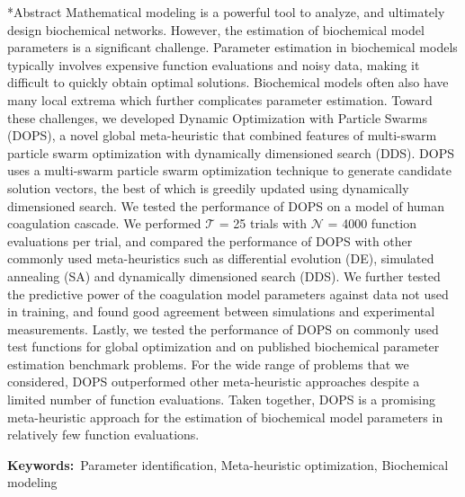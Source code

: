 \documentclass[12pt]{article}
\makeatletter
\renewcommand\section{\@startsection
	{subsection}{2}{0mm}
	{-0.2in}
	{0.05\baselineskip}
	{\normalfont\large\bfseries}}
\makeatother
\begin{document}
\section*{Abstract}
Mathematical modeling is a powerful tool to analyze, and ultimately design biochemical networks.
However, the estimation of biochemical model parameters is a significant challenge.
Parameter estimation in biochemical models typically involves expensive function evaluations and noisy data, making it difficult to quickly obtain optimal solutions.
Biochemical models often also have many local extrema which further complicates parameter estimation.
Toward these challenges, we developed Dynamic Optimization with Particle Swarms (DOPS), a novel global meta-heuristic that combined features of multi-swarm particle swarm optimization with dynamically dimensioned search (DDS).
DOPS uses a multi-swarm particle swarm optimization technique to generate candidate solution vectors, the best of which is greedily updated using dynamically dimensioned search.
We tested the performance of DOPS on a model of human coagulation cascade.
We performed $\mathcal{T}$ = 25 trials with $\mathcal{N}$ = 4000 function evaluations per trial, and compared the performance of DOPS with other commonly
used meta-heuristics such as differential evolution (DE), simulated annealing (SA) and dynamically dimensioned search (DDS).
We further tested the predictive power of the coagulation model parameters against data not used in training, and found good agreement between simulations and experimental measurements.
Lastly, we tested the performance of DOPS on commonly used test functions for global optimization and on published biochemical parameter estimation benchmark problems.
For the wide range of problems that we considered, DOPS outperformed other meta-heuristic approaches despite a limited number of function evaluations.
Taken together, DOPS is a promising meta-heuristic approach for the estimation of biochemical model parameters in relatively few function evaluations.

\vspace{0.1in}
{\noindent \textbf{Keywords:}~Parameter identification, Meta-heuristic optimization, Biochemical modeling}

\end{document}

